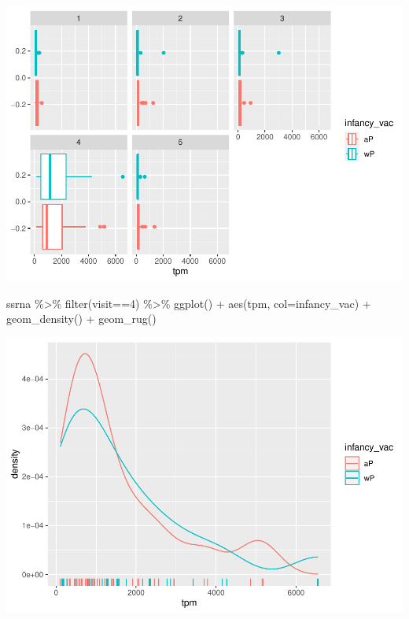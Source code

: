 \documentclass[
]{article}
\newenvironment{Shaded}{\begin{snugshade}}{\end{snugshade}}
\newcommand{\AttributeTok}[1]{\textcolor[rgb]{0.77,0.63,0.00}{#1}}
\newcommand{\DecValTok}[1]{\textcolor[rgb]{0.00,0.00,0.81}{#1}}
\newcommand{\FunctionTok}[1]{\textcolor[rgb]{0.00,0.00,0.00}{#1}}
\newcommand{\NormalTok}[1]{#1}
\newcommand{\SpecialCharTok}[1]{\textcolor[rgb]{0.00,0.00,0.00}{#1}}
\begin{document}
\includegraphics{lab-19-143_files/figure-latex/unnamed-chunk-30-1.pdf}

\begin{Shaded}
\begin{Highlighting}[]
\NormalTok{ssrna }\SpecialCharTok{\%\textgreater{}\%}  
  \FunctionTok{filter}\NormalTok{(visit}\SpecialCharTok{==}\DecValTok{4}\NormalTok{) }\SpecialCharTok{\%\textgreater{}\%} 
  \FunctionTok{ggplot}\NormalTok{() }\SpecialCharTok{+}
    \FunctionTok{aes}\NormalTok{(tpm, }\AttributeTok{col=}\NormalTok{infancy\_vac) }\SpecialCharTok{+} \FunctionTok{geom\_density}\NormalTok{() }\SpecialCharTok{+} 
    \FunctionTok{geom\_rug}\NormalTok{() }
\end{Highlighting}
\end{Shaded}

\includegraphics{lab-19-143_files/figure-latex/unnamed-chunk-31-1.pdf}
\end{document}
